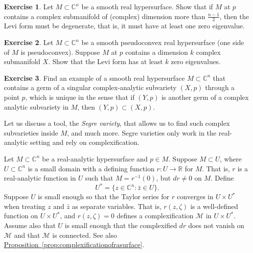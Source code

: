 \documentclass[12pt,openany]{book}
\newcommand{\C}{{\mathbb{C}}}
\newcommand{\R}{{\mathbb{R}}}
\newcommand{\sM}{{\mathscr{M}}}
\newcommand{\myindex}[1]{#1\index{#1}}
\theoremstyle{plain}
\theoremstyle{remark}
\theoremstyle{definition}
\newenvironment{exbox}{%
    \def\FrameCommand{\vrule width 1pt \relax\hspace{10pt}}%
    \MakeFramed{\advance\hsize-\width\FrameRestore}%
}{%
    \endMakeFramed
}
\theoremstyle{exercise}
\newtheorem{exercise}{Exercise}[section]
\theoremstyle{example}
\newcommand{\propref}[1]{\hyperref[#1]{Proposition~\ref*{#1}}}
\begin{document}
\begin{exbox}
\begin{exercise}
Let $M \subset \C^n$ be a smooth real hypersurface.
Show that if $M$ at $p$ contains a complex submanifold of (complex)
dimension more than
$\frac{n-1}{2}$, then the Levi form must be degenerate, that is, it must
have at least one zero eigenvalue.
\end{exercise}

\begin{exercise}
Let $M \subset \C^n$ be a smooth pseudoconvex real hypersurface
(one side of $M$ is pseudoconvex).
Suppose $M$ at $p$ contains a dimension $k$ complex submanifold $X$.
Show that the Levi form has at least $k$ zero eigenvalues.
\end{exercise}

\begin{exercise}
Find an example of a smooth real hypersurface $M \subset \C^n$ that contains a
germ of a singular complex-analytic subvariety $(X,p)$ through a point $p$,
which is unique in the sense that if $(Y,p)$ is another germ of a complex
analytic subvariety in $M$, then $(Y,p) \subset (X,p)$.
\end{exercise}
\end{exbox}

Let us discuss a tool, the \emph{\myindex{Segre variety}}, that allows us to
find such complex subvarieties inside $M$, and much more.  Segre varieties only
work in the real-analytic setting and rely on complexification.

Let $M \subset \C^n$ be a real-analytic hypersurface and $p \in M$.
Suppose $M \subset U$,
where $U \subset \C^n$ is a small domain with a defining function $r \colon
U  \to \R$ for $M$.  That is, $r$ is a real-analytic function in $U$ such that
$M = r^{-1}(0)$, but
$dr \not= 0$ on $M$.  Define
%
\begin{equation*}
U^* = \bigl\{ z \in \C^n : \bar{z} \in U \bigr\} .
\end{equation*}
Suppose $U$ is small enough so that the Taylor series for $r$
converges in $U \times U^*$ when treating $z$ and $\bar{z}$ as separate
variables.  That is, $r(z,\zeta)$ is a well-defined function on
$U \times U^*$, and $r(z,\zeta) = 0$ defines a complexification $\sM$
in $U \times U^*$.  Assume also that $U$ is small enough that
the complexified
$dr$ does not vanish on $\sM$ and that $\sM$ is connected.
See also \propref{prop:complexificationofrasurface}.
\end{document}
